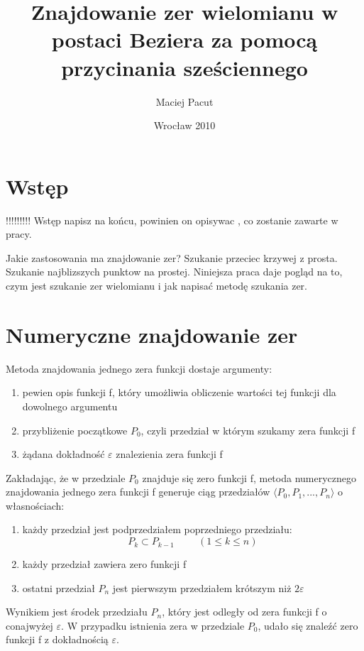 \documentclass[11pt,a4paper,oneside]{report}
\title{Znajdowanie zer wielomianu w postaci Beziera za pomocą przycinania sześciennego}
\author{Maciej Pacut}
\date{Wrocław 2010}
\begin{document}
\maketitle
\newpage

\section{Wstęp}

!!!!!!!!! Wstęp napisz na końcu, powinien on opisywac , co zostanie zawarte w pracy.

Jakie zastosowania ma znajdowanie zer? Szukanie przeciec krzywej z prosta. Szukanie najblizszych punktow na prostej.
Niniejsza praca daje pogląd na to, czym jest szukanie zer wielomianu i jak napisać metodę szukania zer.

\section{Numeryczne znajdowanie zer}

Metoda znajdowania jednego zera funkcji dostaje argumenty:
\begin{enumerate}
\item pewien opis funkcji f, który umożliwia obliczenie wartości tej funkcji dla dowolnego argumentu
\item przybliżenie początkowe $P_0$, czyli przedział w którym szukamy zera funkcji f
\item żądana dokładność $\varepsilon$ znalezienia zera funkcji f
\end{enumerate}

Zakładając, że w przedziale $P_0$ znajduje się zero funkcji f, metoda numerycznego znajdowania jednego zera funkcji f generuje ciąg przedziałów $\langle P_0, P_1, ..., P_n\rangle$ o własnościach:
\begin{enumerate}
\item każdy przedział jest podprzedziałem poprzedniego przedziału:
$$P_k \subset P_{k-1}\hspace{1cm}(1 \leq k \leq n)$$
\item każdy przedział zawiera zero funkcji f
\item ostatni przedział $P_n$ jest pierwszym przedziałem krótszym niż $2 \varepsilon$
\end{enumerate}

Wynikiem jest środek przedziału $P_n$, który jest odległy od zera funkcji f o conajwyżej $\varepsilon$. W przypadku istnienia zera w przedziale $P_0$, udało się znaleźć zero funkcji f z dokładnością $\varepsilon$.
\end{document}
